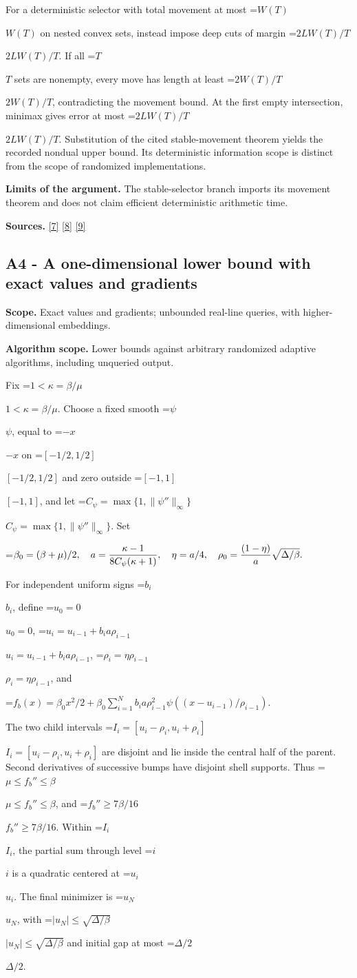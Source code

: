 \documentclass[10pt,a4paper]{article}
\newcommand{\AtlasMath}[1]{\par\begingroup\centering\setbox0=\hbox{$\displaystyle #1$}\ifdim\wd0>1.4\linewidth\typeout{ATLAS WIDE FORMULA: \the\wd0}\fi\ifdim\wd0>\linewidth\resizebox{\linewidth}{!}{\box0}\else\box0\fi\par\endgroup}
\newcommand{\AtlasInlineMath}[1]{\begingroup\setbox0=\hbox{$#1$}\ifdim\wd0>.4\linewidth\endgroup\AtlasMath{#1}\else\endgroup$#1$\fi}
\begin{document}
For a deterministic selector with total movement at most \AtlasInlineMath{W(T)} on nested convex sets, instead impose deep cuts of margin \AtlasInlineMath{2LW(T)/T}. If all \AtlasInlineMath{T} sets are nonempty, every move has length at least \AtlasInlineMath{2W(T)/T}, contradicting the movement bound. At the first empty intersection, minimax gives error at most \AtlasInlineMath{2LW(T)/T}. Substitution of the cited stable-movement theorem yields the recorded nondual upper bound. Its deterministic information scope is distinct from the scope of randomized implementations.

\textbf{Limits of the argument.} The stable-selector branch imports its movement theorem and does not claim efficient deterministic arithmetic time.

\textbf{Sources.} \href{https://arxiv.org/pdf/1405.4980}{[7]} \href{https://www2.isye.gatech.edu/~nemirovs/MOR_AccuracyCertificates.pdf}{[8]} \href{https://arxiv.org/pdf/2609.20701}{[9]}

\subsection{A4 - A one-dimensional lower bound with exact values and gradients}
\textbf{Scope.} Exact values and gradients; unbounded real-line queries, with higher-dimensional embeddings.

\textbf{Algorithm scope.} Lower bounds against arbitrary randomized adaptive algorithms, including unqueried output.

Fix \AtlasInlineMath{1<\kappa=\beta/\mu}. Choose a fixed smooth \AtlasInlineMath{\psi}, equal to \AtlasInlineMath{-x} on \AtlasInlineMath{[-1/2,1/2]} and zero outside \AtlasInlineMath{[-1,1]}, and let \AtlasInlineMath{C_\psi=\max\{1,\|\psi''\|_\infty\}}. Set

\AtlasMath{\beta_0=(\beta+\mu)/2,\quad a={\kappa-1\over8C_\psi(\kappa+1)},\quad
\eta=a/4,\quad \rho_0={(1-\eta)\over a}\sqrt{\Delta/\beta}.}

For independent uniform signs \AtlasInlineMath{b_i}, define \AtlasInlineMath{u_0=0},
\AtlasInlineMath{u_i=u_{i-1}+b_i a\rho_{i-1}}, \AtlasInlineMath{\rho_i=\eta\rho_{i-1}}, and

\AtlasMath{f_b(x)=\beta_0x^2/2+
\beta_0\sum_{i=1}^N b_i a\rho_{i-1}^2
\psi((x-u_{i-1})/\rho_{i-1}).}

The two child intervals \AtlasInlineMath{I_i=[u_i-\rho_i,u_i+\rho_i]} are disjoint and lie inside the central half of the parent. Second derivatives of successive bumps have disjoint shell supports. Thus \AtlasInlineMath{\mu\le f_b''\le\beta}, and \AtlasInlineMath{f_b''\ge7\beta/16}. Within \AtlasInlineMath{I_i}, the partial sum through level \AtlasInlineMath{i} is a quadratic centered at \AtlasInlineMath{u_i}. The final minimizer is \AtlasInlineMath{u_N}, with \AtlasInlineMath{|u_N|\le\sqrt{\Delta/\beta}} and initial gap at most \AtlasInlineMath{\Delta/2}.
\end{document}
